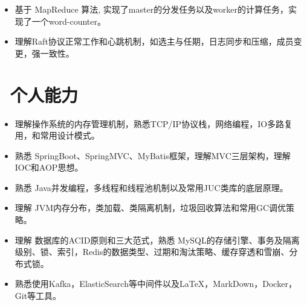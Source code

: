 \documentclass{resume}
\begin{document}
\vspace{-1.5ex}

\vspace{-0.5ex}
\begin{onehalfspacing}
\begin{itemize}
  \item 基于 MapReduce 算法, 实现了master的分发任务以及worker的计算任务，实现了一个word-counter。
  \item 理解Raft协议正常工作和心跳机制，如选主与任期，日志同步和压缩，成员变更，强一致性。
\end{itemize}
\end{onehalfspacing}


\vspace{-1.5ex}

\section{\faCogs\ 个人能力}
\begin{itemize}[parsep=0.5ex]
  \item 理解操作系统的内存管理机制，熟悉TCP/IP协议栈，网络编程，IO多路复用，和常用设计模式。
  \item 熟悉 SpringBoot、SpringMVC、MyBatis框架，理解MVC三层架构，理解IOC和AOP思想。
  \item 熟悉 Java并发编程，多线程和线程池机制以及常用JUC类库的底层原理。
  \item 理解 JVM内存分布，类加载、类隔离机制，垃圾回收算法和常用GC调优策略。
  \item 理解 数据库的ACID原则和三大范式，熟悉 MySQL的存储引擎、事务及隔离级别、锁、索引，Redis的数据类型、过期和淘汰策略、缓存穿透和雪崩、分布式锁。
  \item 熟悉使用Kafka，ElasticSearch等中间件以及\LaTeX，MarkDown，Docker，Git等工具。
\end{itemize}

\vspace{-1ex}
\vspace{-1ex}
\end{document}
